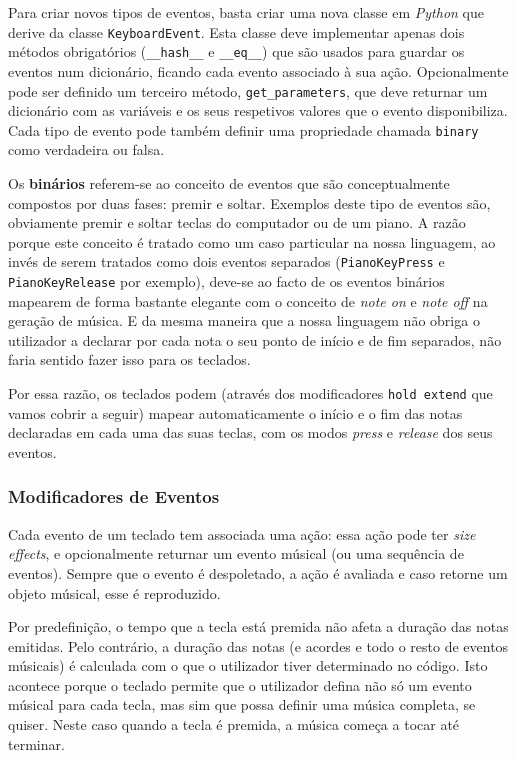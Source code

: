 Para criar novos tipos de eventos, basta criar uma nova classe em \textit{Python} que derive da classe \texttt{KeyboardEvent}. Esta classe deve implementar apenas dois métodos obrigatórios (\texttt{\_\_hash\_\_} e \texttt{\_\_eq\_\_}) que são usados para guardar os eventos num dicionário, ficando cada evento associado à sua ação. Opcionalmente pode ser definido um terceiro método, \texttt{get\_parameters}, que deve returnar um dicionário com as variáveis e os seus respetivos valores que o evento disponibiliza. Cada tipo de evento pode também definir uma propriedade chamada \texttt{binary} como verdadeira ou falsa.

Os \textbf{binários} referem-se ao conceito de eventos que são conceptualmente compostos por duas fases: premir e soltar. Exemplos deste tipo de eventos são, obviamente premir e soltar teclas do computador ou de um piano. A razão porque este conceito é tratado como um caso particular na nossa linguagem, ao invés de serem tratados como dois eventos separados (\texttt{PianoKeyPress} e \texttt{PianoKeyRelease} por exemplo), deve-se ao facto de os eventos binários mapearem de forma bastante elegante com o conceito de \textit{note on} e \textit{note off} na geração de música. E da mesma maneira que a nossa linguagem não obriga o utilizador a declarar por cada nota o seu ponto de início e de fim separados, não faria sentido fazer isso para os teclados.

Por essa razão, os teclados podem (através dos modificadores \texttt{hold extend} que vamos cobrir a seguir) mapear automaticamente o início e o fim das notas declaradas em cada uma das suas teclas, com os modos \textit{press} e \textit{release} dos seus eventos.

\subsubsection{Modificadores de Eventos}
Cada evento de um teclado tem associada uma ação: essa ação pode ter \textit{size effects}, e opcionalmente returnar um evento músical (ou uma sequência de eventos). Sempre que o evento é despoletado, a ação é avaliada e caso retorne um objeto músical, esse é reproduzido.

Por predefinição, o tempo que a tecla está premida não afeta a duração das notas emitidas. Pelo contrário, a duração das notas (e acordes e todo o resto de eventos músicais) é calculada com o que o utilizador tiver determinado no código. Isto acontece porque o teclado permite que o utilizador defina não só um evento músical para cada tecla, mas sim que possa definir uma música completa, se quiser. Neste caso quando a tecla é premida, a música começa a tocar até terminar.

